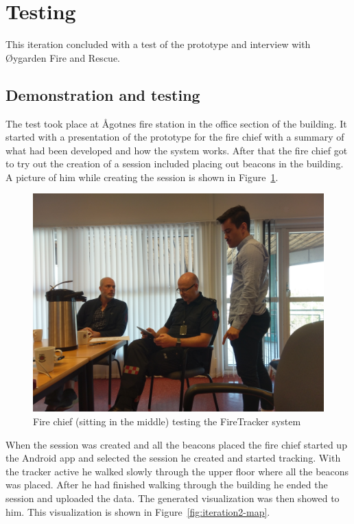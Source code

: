 \documentclass[../Main/thesis.tex]{subfiles}
\begin{document}
\section{Testing}
This iteration concluded with a test of the prototype and interview with Øygarden Fire and Rescue.

\subsection{Demonstration and testing}
The test took place at Ågotnes fire station in the office section of the building.
It started with a presentation of the prototype for the fire chief with a summary of what had been developed and how the system works.
After that the fire chief got to try out the creation of a session included placing out beacons in the building. 
A picture of him while creating the session is shown in Figure~\ref{fig:iteration2-demo}.

\begin{figure}[h]
	\centering
	\includegraphics[width=\textwidth]{../fig/iteration2-demo}
	\caption[Fire chief testing the FireTracker system]{Fire chief (sitting in the middle) testing the FireTracker system}
	\label{fig:iteration2-demo}
\end{figure}

When the session was created and all the beacons placed the fire chief started up the Android app and selected the session he created and started tracking.
With the tracker active he walked slowly through the upper floor where all the beacons was placed.
After he had finished walking through the building he ended the session and uploaded the data.
The generated visualization was then showed to him.
This visualization is shown in Figure~\ref{fig:iteration2-map}.
\end{document}
